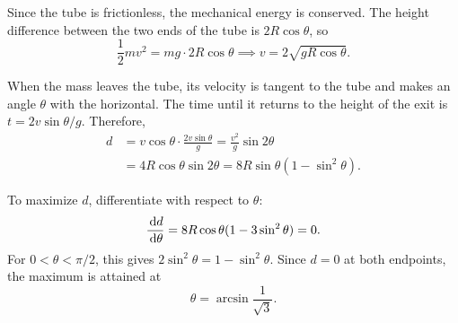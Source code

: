 \documentclass{article}
\begin{document}
\begin{solution}
	Since the tube is frictionless, the mechanical energy is conserved. The
	height difference between the two ends of the tube is $2R\cos\theta$, so
	\[ \frac{1}{2}mv^2 = mg\cdot 2R\cos\theta \implies v = 2\sqrt{gR\cos\theta}. \]

	When the mass leaves the tube, its velocity is tangent to the tube and
	makes an angle $\theta$ with the horizontal. The time until it returns to
	the height of the exit is $t = 2v\sin\theta/g$. Therefore,
	\begin{align*}
		d &= v\cos\theta\cdot\frac{2v\sin\theta}{g}
		= \frac{v^2}{g}\sin 2\theta \\
		&= 4R\cos\theta\sin 2\theta
		= 8R\sin\theta(1-\sin^2\theta).
	\end{align*}

	To maximize $d$, differentiate with respect to $\theta$:
	\[ \frac{\,\mathrm{d} d}{\,\mathrm{d}\theta} = 8R\cos\theta(1-3\sin^2\theta) = 0. \]
	For $0<\theta<\pi/2$, this gives $2\sin^2\theta = 1-\sin^2\theta$.
	Since $d=0$ at both endpoints, the maximum is attained at
	\[ \boxed{\theta = \arcsin\frac{1}{\sqrt{3}}}. \]
\end{solution}
\end{document}
